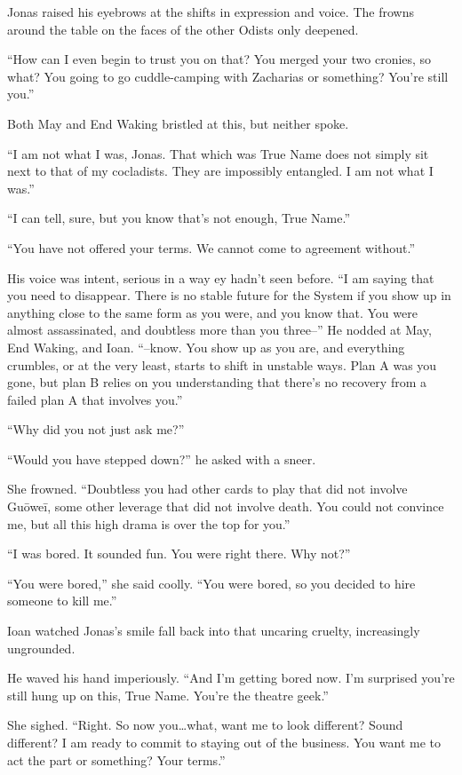 Jonas raised his eyebrows at the shifts in expression and voice. The frowns around the table on the faces of the other Odists only deepened.

``How can I even begin to trust you on that? You merged your two cronies, so what? You going to go cuddle-camping with Zacharias or something? You're still you.''

Both May and End Waking bristled at this, but neither spoke.

``I am not what I was, Jonas. That which was True Name does not simply sit next to that of my cocladists. They are impossibly entangled. I am not what I was.''

``I can tell, sure, but you know that's not enough, True Name.''

``You have not offered your terms. We cannot come to agreement without.''

His voice was intent, serious in a way ey hadn't seen before. ``I am saying that you need to disappear. There is no stable future for the System if you show up in anything close to the same form as you were, and you know that. You were almost assassinated, and doubtless more than you three--'' He nodded at May, End Waking, and Ioan. ``--know. You show up as you are, and everything crumbles, or at the very least, starts to shift in unstable ways. Plan A was you gone, but plan B relies on you understanding that there's no recovery from a failed plan A that involves you.''

``Why did you not just ask me?''

``Would you have stepped down?'' he asked with a sneer.

She frowned. ``Doubtless you had other cards to play that did not involve Guōweī, some other leverage that did not involve death. You could not convince me, but all this high drama is over the top for you.''

``I was bored. It sounded fun. You were right there. Why not?''

``You were bored,'' she said coolly. ``You were bored, so you decided to hire someone to kill me.''

Ioan watched Jonas's smile fall back into that uncaring cruelty, increasingly ungrounded.

He waved his hand imperiously. ``And I'm getting bored now. I'm surprised you're still hung up on this, True Name. You're the theatre geek.''

She sighed. ``Right. So now you\ldots what, want me to look different? Sound different? I am ready to commit to staying out of the business. You want me to act the part or something? Your terms.''

